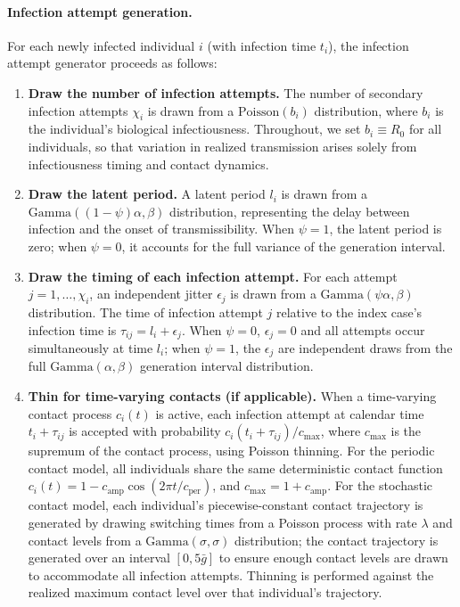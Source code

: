 \paragraph{Infection attempt generation.}
For each newly infected individual $i$ (with infection time $t_i$), the infection attempt generator proceeds as follows:
\begin{enumerate}
  \item \textbf{Draw the number of infection attempts.} The number of secondary infection attempts $\chi_i$ is drawn from a $\text{Poisson}(b_i)$ distribution, where $b_i$ is the individual's biological infectiousness. Throughout, we set $b_i \equiv R_0$ for all individuals, so that variation in realized transmission arises solely from infectiousness timing and contact dynamics.
  \item \textbf{Draw the latent period.} A latent period $l_i$ is drawn from a $\text{Gamma}((1-\psi)\alpha, \beta)$ distribution, representing the delay between infection and the onset of transmissibility. When $\psi = 1$, the latent period is zero; when $\psi = 0$, it accounts for the full variance of the generation interval.
  \item \textbf{Draw the timing of each infection attempt.} For each attempt $j = 1, \ldots, \chi_i$, an independent jitter $\epsilon_j$ is drawn from a $\text{Gamma}(\psi\alpha, \beta)$ distribution. The time of infection attempt $j$ relative to the index case's infection time is $\tau_{ij} = l_i + \epsilon_j$. When $\psi = 0$, $\epsilon_j = 0$ and all attempts occur simultaneously at time $l_i$; when $\psi = 1$, the $\epsilon_j$ are independent draws from the full $\text{Gamma}(\alpha, \beta)$ generation interval distribution.
  \item \textbf{Thin for time-varying contacts (if applicable).} When a time-varying contact process $c_i(t)$ is active, each infection attempt at calendar time $t_i + \tau_{ij}$ is accepted with probability $c_i(t_i + \tau_{ij}) / c_{\max}$, where $c_{\max}$ is the supremum of the contact process, using Poisson thinning. For the periodic contact model, all individuals share the same deterministic contact function $c_i(t) = 1 - c_{\text{amp}} \cos(2\pi t / c_{\text{per}})$, and $c_{\max} = 1 + c_{\text{amp}}$. For the stochastic contact model, each individual's piecewise-constant contact trajectory is generated by drawing switching times from a Poisson process with rate $\lambda$ and contact levels from a $\text{Gamma}(\sigma, \sigma)$ distribution; the contact trajectory is generated over an interval $[0, 5\bar{g}]$ to ensure enough contact levels are drawn to accommodate all infection attempts. Thinning is performed against the realized maximum contact level over that individual's trajectory.

\end{enumerate}
